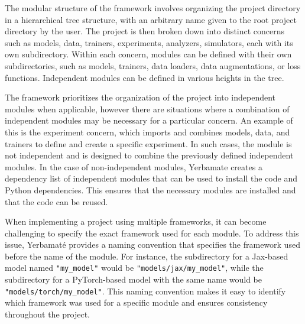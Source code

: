  The modular structure of the framework involves organizing the project directory in a hierarchical tree structure, with an arbitrary name given to the root project directory by the user. The project is then broken down into distinct concerns such as models, data, trainers, experiments, analyzers, simulators, each with its own subdirectory. Within each concern, modules can be defined with their own subdirectories, such as models, trainers, data loaders, data augmentations, or loss functions. Independent modules can be defined in various heights in the tree.

The framework prioritizes the organization of the project into independent modules when applicable, however there are situations where a combination of independent modules may be necessary for a particular concern. An example of this is the experiment concern, which imports and combines models, data, and trainers to define and create a specific experiment. In such cases, the module is not independent and is designed to combine the previously defined independent modules. In the case of non-independent modules, Yerbamate creates a dependency list of independent modules that can be used to install the code and Python dependencies. This ensures that the necessary modules are installed and that the code can be reused. 

When implementing a project using multiple frameworks, it can become challenging to specify the exact framework used for each module. To address this issue, Yerbamaté provides a naming convention that specifies the framework used before the name of the module. For instance, the subdirectory for a Jax-based model named \texttt{"my\_model"} would be \texttt{"models/jax/my\_model"}, while the subdirectory for a PyTorch-based model with the same name would be \texttt{"models/torch/my\_model"}. This naming convention makes it easy to identify which framework was used for a specific module and ensures consistency throughout the project.





